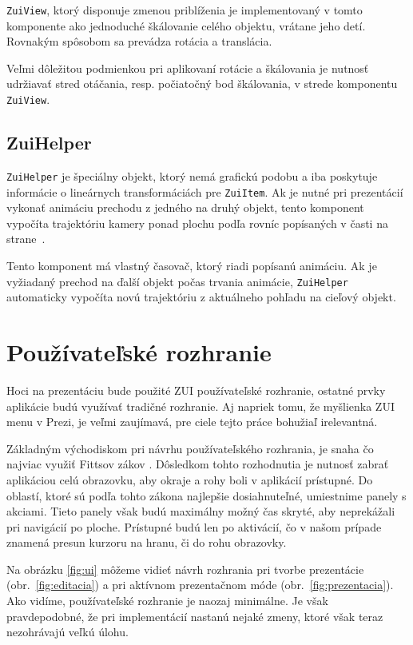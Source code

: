 \texttt{ZuiView}, ktorý disponuje zmenou priblíženia je implementovaný v tomto komponente ako jednoduché škálovanie celého objektu, vrátane jeho detí. Rovnakým spôsobom sa prevádza rotácia a translácia.

Veľmi dôležitou podmienkou pri aplikovaní rotácie a škálovania je nutnosť udržiavať stred otáčania, resp. počiatočný bod škálovania, v strede komponentu \texttt{ZuiView}.

\subsection{ZuiHelper}

\texttt{ZuiHelper} je špeciálny objekt, ktorý nemá grafickú podobu a iba poskytuje informácie o lineárnych transformáciách pre \texttt{ZuiItem}. Ak je nutné pri prezentácií vykonať animáciu prechodu z jedného na druhý objekt, tento komponent vypočíta trajektóriu kamery ponad plochu podľa rovníc popísaných v časti  na strane~\pageref{sec:animation}.

Tento komponent má vlastný časovač, ktorý riadi popísanú animáciu. Ak je vyžiadaný prechod na ďalší objekt počas trvania animácie, \texttt{ZuiHelper} automaticky vypočíta novú trajektóriu z aktuálneho pohľadu na cieľový objekt.

\section{Používateľské rozhranie}

Hoci na prezentáciu bude použité ZUI používateľské rozhranie, ostatné prvky aplikácie budú využívať tradičné rozhranie. Aj napriek tomu, že myšlienka ZUI menu v Prezi, je veľmi zaujímavá, pre ciele tejto práce bohužiaľ irelevantná.

Základným východiskom pri návrhu používateľského rozhrania, je snaha čo najviac využiť Fittsov zákov \cite{fitts}. Dôsledkom tohto rozhodnutia je nutnosť zabrať aplikáciou celú obrazovku, aby okraje a rohy boli v aplikácií prístupné. Do oblastí, ktoré sú podľa tohto zákona najlepšie dosiahnuteľné, umiestnime panely s akciami. Tieto panely však budú maximálny možný čas skryté, aby neprekážali pri navigácií po ploche. Prístupné budú len po aktivácií, čo v našom prípade znamená presun kurzoru na hranu, či do rohu obrazovky.

Na obrázku \ref{fig:ui} môžeme vidieť návrh rozhrania pri tvorbe prezentácie (obr.~\ref{fig:editacia}) a pri aktívnom prezentačnom móde (obr.~\ref{fig:prezentacia}). Ako vidíme, používateľské rozhranie je naozaj minimálne. Je však pravdepodobné, že pri implementácií nastanú nejaké zmeny, ktoré však teraz nezohrávajú veľkú úlohu.

